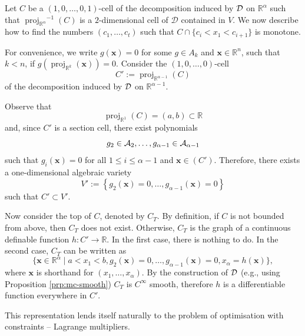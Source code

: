\documentclass[
]{book}
\theoremstyle{definition}
\theoremstyle{definition}
\theoremstyle{definition}
\theoremstyle{definition}
\theoremstyle{remark}
\begin{document}
Let \(C\) be a \((1,0,\ldots,0,1)\)-cell of the decomposition induced by \(\cal D\) on \(\mathbb{R}^{\alpha}\) such that \({\operatorname{proj}_{\mathbb{R}^{\alpha}}}^{-1}(C)\) is a \(2\)-dimensional cell of \(\mathcal{D}\) contained in \(V\).
We now describe how to find the numbers \((c_1,\ldots,c_t)\) such that \(C \cap \{ c_i < x_1 < c_{i+1} \}\) is monotone.

For convenience, we write \(g(\mathbf{x}) = 0\) for some \(g \in A_k\) and \(\mathbf{x} \in \mathbb{R}^n\), such that \(k < n\), if \(g({\operatorname{proj}_{\mathbb{R}^{k}}}(\mathbf{x})) = 0\).
Consider the \((1,0,\ldots,0)\)-cell
\[
C' := {\operatorname{proj}_{\mathbb{R}^{\alpha - 1}}}(C)
\]
of the decomposition induced by \(\cal D\) on \(\mathbb{R}^{\alpha - 1}\).

Observe that
\[
{\operatorname{proj}_{\mathbb{R}^{1}}}(C) = (a,b) \subset \mathbb{R}
\]
and, since \(C'\) is a section cell, there exist polynomials
\[
g_2 \in {\cal A}_2,\ldots,g_{\alpha - 1} \in {\cal A}_{\alpha - 1}
\] such that \(g_i(\mathbf{x}) = 0\) for all \(1\le i \le \alpha - 1\) and \(\mathbf{x} \in (C')\).
Therefore, there exists a one-dimensional algebraic variety
\[
V' := \left\{ g_2(\mathbf{x}) = 0, \ldots, g_{\alpha - 1}(\mathbf{x}) = 0 \right\}
\]
such that \(C' \subset V'\).

Now consider the top of \(C\), denoted by \(C_T\).
By definition, if \(C\) is not bounded from above, then \(C_T\) does not exist. Otherwise, \(C_T\) is the graph of a continuous definable function \(h : C' \to \mathbb{R}\).
In the first case, there is nothing to do.
In the second case, \(C_T\) can be written as
\begin{equation}
\{ \mathbf{x} \in \mathbb{R}^\alpha \mid a < x_1 < b, g_2(\mathbf{x}) = 0, \ldots, g_{\alpha - 1}(\mathbf{x}) = 0, x_\alpha = h(\mathbf{x}) \},
\label{eq:c-alpha-top}
\end{equation}
where \(\mathbf{x}\) is shorthand for \((x_1,\ldots,x_\alpha)\).
By the construction of \(\cal D\) (e.g., using Proposition \ref{prp:mc-smooth}) \(C_T\) is \(C^\infty\) smooth, therefore \(h\) is a differentiable function everywhere in \(C'\).

This representation lends itself naturally to the problem of optimisation with constraints -- Lagrange multipliers.
\end{document}
